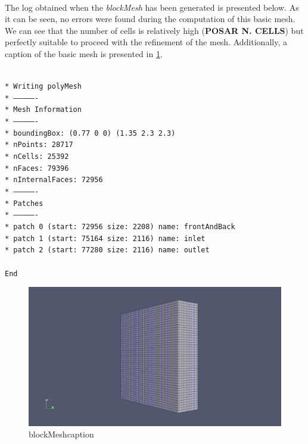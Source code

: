 \paragraph{}The log obtained when the \textit{blockMesh} has been generated is presented below. As it can be seen, no errors were found during the computation of this basic mesh. We can see that the number of cells is relatively high (\textbf{POSAR N. CELLS}) but perfectly suitable to proceed with the refinement of the mesh. Additionally, a caption of the basic mesh is presented in \ref{blockMeshcaption}.

\texttt{\\*
Writing polyMesh\\*
----------------\\*
Mesh Information\\*
----------------\\*
  boundingBox: (0.77 0 0) (1.35 2.3 2.3)\\*
  nPoints: 28717\\*
  nCells: 25392\\*
  nFaces: 79396\\*
  nInternalFaces: 72956\\*
----------------\\*
Patches\\*
----------------\\*
  patch 0 (start: 72956 size: 2208) name: frontAndBack\\*
  patch 1 (start: 75164 size: 2116) name: inlet\\*
  patch 2 (start: 77280 size: 2116) name: outlet\\
  \\
  End
}

\begin{figure}[h!]
\includegraphics[scale=0.26]{./mesh/screenshots/blockmesh}
\centering
\caption{blockMeshcaption}
\label{blockMeshcaption}
\end{figure}

